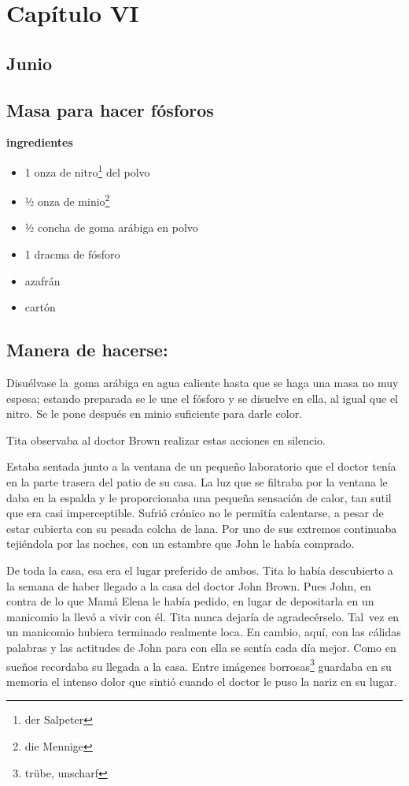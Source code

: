 \clearpage

\section*{ Capítulo VI }
\subsection*{ Junio }
\subsection*{ Masa para hacer fósforos }
\textbf{ingredientes}
\begin{itemize}
    \item 1 onza de nitro\footnote{der Salpeter} del polvo
    \item ½ onza de minio\footnote{die Mennige}
    \item ½ concha de goma arábiga en polvo
    \item 1 dracma de fósforo
    \item azafrán
    \item cartón
\end{itemize}

\subsection*{ Manera de hacerse: }
Disuélvase la~goma arábiga en agua caliente hasta que se haga una
masa no muy espesa; estando preparada se le une el fósforo y se disuelve
en ella, al igual que el nitro. Se le pone después en minio suficiente
para darle color.

Tita observaba al doctor Brown realizar estas acciones en silencio.

Estaba sentada junto a la ventana de un pequeño laboratorio que el
doctor tenía en la parte trasera del patio de su casa. La luz que se
filtraba por la ventana le daba en la espalda y le proporcionaba una
pequeña sensación de calor, tan sutil que era casi imperceptible. Sufrió
crónico no le permitía calentarse, a pesar de estar cubierta con su
pesada colcha de lana. Por uno de sus extremos continuaba tejiéndola por
las noches, con un estambre que John le había comprado.

De toda la casa, esa era el lugar preferido de ambos. Tita lo había
descubierto a la semana de haber llegado a la casa del doctor John
Brown. Pues John, en contra de lo que Mamá Elena le había pedido, en
lugar de depositarla en un manicomio la llevó a vivir con él. Tita
nunca dejaría de agradecérselo. Tal~vez en un manicomio hubiera
terminado realmente loca. En cambio, aquí, con las cálidas palabras y
las actitudes de John para con ella se sentía cada día mejor. Como en
sueños recordaba su llegada a la casa. Entre imágenes borrosas\footnote{trübe, unscharf}
guardaba en su memoria el intenso dolor que sintió cuando el doctor
le puso la nariz en su lugar.

